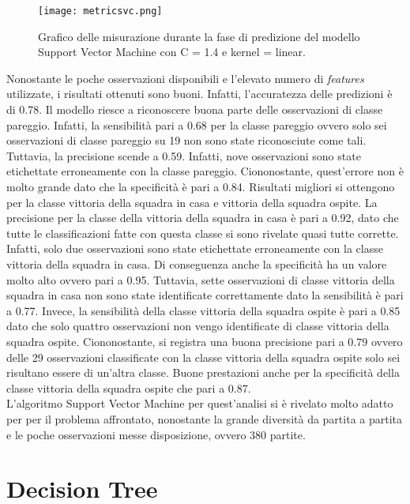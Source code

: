 \begin{figure}[]
	\begin{center}
		\texttt{[image: metricsvc.png]}
		\caption{Grafico delle misurazione durante la fase di predizione del modello Support Vector Machine con \textsf{C} = 1.4 e \textsf{kernel} = linear.
		} 
		\label{fig:svcmetrics}
	\end{center}
\end{figure}
Nonostante le poche osservazioni disponibili e l'elevato numero di \emph{features} utilizzate, i risultati ottenuti sono buoni. Infatti, l'accuratezza delle predizioni è di 0.78. Il modello riesce a riconoscere buona parte delle osservazioni di classe pareggio. Infatti, la sensibilità pari a 0.68 per la classe pareggio ovvero solo sei osservazioni di classe pareggio su 19 non sono state riconosciute come tali. Tuttavia, la precisione scende a 0.59. Infatti, nove osservazioni sono state etichettate erroneamente con la classe pareggio. Ciononostante, quest'errore non è molto grande dato che la specificità è pari a 0.84. Risultati migliori si ottengono per la classe vittoria della squadra in casa e vittoria della squadra ospite. La precisione per la classe della vittoria della squadra in casa è pari a 0.92, dato che tutte le classificazioni fatte con questa classe si sono rivelate quasi tutte corrette. Infatti, solo due osservazioni sono state etichettate erroneamente con la classe vittoria della squadra in casa. Di conseguenza anche la specificità ha un valore molto alto ovvero pari a 0.95. Tuttavia, sette osservazioni di classe vittoria della squadra in casa non sono state identificate correttamente dato la sensibilità è pari a 0.77. Invece, la sensibilità della classe vittoria della squadra ospite è pari a 0.85 dato che solo quattro osservazioni non vengo identificate di classe vittoria della squadra ospite. Ciononostante, si registra una buona precisione pari a 0.79 ovvero delle 29 osservazioni classificate con la classe vittoria della squadra ospite solo sei risultano essere di un'altra classe. Buone prestazioni anche per la specificità della classe vittoria della squadra ospite che pari a 0.87.\\
L'algoritmo Support Vector Machine per quest'analisi si è rivelato molto adatto per per il problema affrontato, nonostante la grande diversità da partita a partita e le poche osservazioni messe disposizione, ovvero 380 partite.


\section{Decision Tree}

